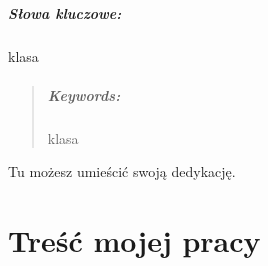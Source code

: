 \documentclass[oneside,polski,logo]{amuthesis}
\author{Jan Kowalski}
\date{Poznań, wrzesień 2017}
\begin{document}
\maketitle
\makestatement

\begin{streszczenie}
\lipsum[1]

\paragraph{Słowa kluczowe:} klasa
\end{streszczenie}

\begin{abstract}
\lipsum[2]

\paragraph{Keywords:} klasa
\end{abstract}

\begin{dedykacja}
Tu możesz umieścić swoją dedykację.
\end{dedykacja}

\tableofcontents


\chapter{Treść mojej pracy}

\lipsum[3]
\end{document}

